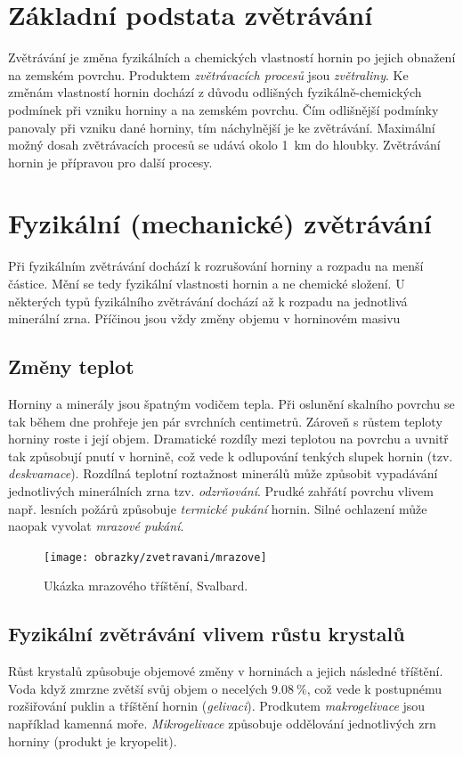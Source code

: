 \section{Základní podstata zvětrávání}
Zvětrávání je změna fyzikálních a chemických vlastností hornin po jejich obnažení na zemském povrchu. Produktem \emph{zvětrávacích procesů} jsou \emph{zvětraliny}. Ke změnám vlastností hornin dochází z důvodu odlišných fyzikálně-chemických podmínek při vzniku horniny a na zemském povrchu. Čím odlišnější podmínky panovaly při vzniku dané horniny, tím náchylnější je ke zvětrávání. Maximální možný dosah zvětrávacích procesů se udává okolo \SI{1}{\kilo\metre} do hloubky. Zvětrávání hornin je přípravou pro další procesy.

\section{Fyzikální (mechanické) zvětrávání}
Při fyzikálním zvětrávání dochází k rozrušování horniny a rozpadu na menší částice. Mění se tedy fyzikální vlastnosti hornin a ne chemické složení. U některých typů fyzikálního zvětrávání dochází až k rozpadu na jednotlivá minerální zrna. Příčinou jsou vždy změny objemu v horninovém masivu

\subsection{Změny teplot}
Horniny a minerály jsou špatným vodičem tepla. Při oslunění skalního povrchu se tak během dne prohřeje jen pár svrchních centimetrů. Zároveň s růstem teploty horniny roste i její objem. Dramatické rozdíly mezi teplotou na povrchu a uvnitř tak způsobují pnutí v hornině, což vede k odlupování tenkých slupek hornin (tzv. \emph{deskvamace}). Rozdílná teplotní roztažnost minerálů může způsobit vypadávání jednotlivých minerálních zrna tzv. \emph{odzrňování}. Prudké zahřátí povrchu vlivem např. lesních požárů způsobuje \emph{termické pukání} hornin. Silné ochlazení může naopak vyvolat \emph{mrazové pukání}.

\begin{figure}
	\centering
	\texttt{[image: obrazky/zvetravani/mrazove]}
	\caption{Ukázka mrazového tříštění, Svalbard.}
	\label{fig:mrazove}
\end{figure}

\subsection{Fyzikální zvětrávání vlivem růstu krystalů}
Růst krystalů způsobuje objemové změny v horninách a jejich následné tříštění. Voda když zmrzne zvětší svůj objem o necelých $\SI{9,08}{\percent}$, což vede k postupnému rozšiřování puklin a tříštění hornin (\emph{gelivaci}). Prodkutem \emph{makrogelivace} jsou například kamenná moře. \emph{Mikrogelivace} způsobuje oddělování jednotlivých zrn horniny (produkt je kryopelit).


